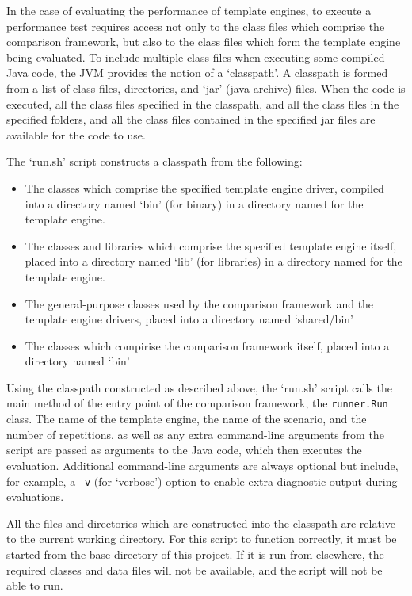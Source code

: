 In the case of evaluating the performance of template engines, to execute a performance test requires access not only to the class files which comprise the comparison framework, but also to the class files which form the template engine being evaluated. To include multiple class files when executing some compiled Java code, the JVM provides the notion of a `classpath'. A classpath is formed from a list of class files, directories, and `jar' (java archive) files. When the code is executed, all the class files specified in the classpath, and all the class files in the specified folders, and all the class files contained in the specified jar files are available for the code to use.

The `run.sh' script constructs a classpath from the following:

\begin{itemize}
    \item The classes which comprise the specified template engine driver, compiled into a directory named `bin' (for binary) in a directory named for the template engine.
    \item The classes and libraries which comprise the specified template engine itself, placed into a directory named `lib' (for libraries) in a directory named for the template engine.
    \item The general-purpose classes used by the comparison framework and the template engine drivers, placed into a directory named `shared/bin'
    \item The classes which compirise the comparison framework itself, placed into a directory named `bin'
\end{itemize}

Using the classpath constructed as described above, the `run.sh' script calls the main method of the entry point of the comparison framework, the \verb!runner.Run! class. The name of the template engine, the name of the scenario, and the number of repetitions, as well as any extra command-line arguments from the script are passed as arguments to the Java code, which then executes the evaluation. Additional command-line arguments are always optional but include, for example, a \verb!-v! (for `verbose') option to enable extra diagnostic output during evaluations.

All the files and directories which are constructed into the classpath are relative to the current working directory. For this script to function correctly, it must be started from the base directory of this project. If it is run from elsewhere, the required classes and data files will not be available, and the script will not be able to run.

